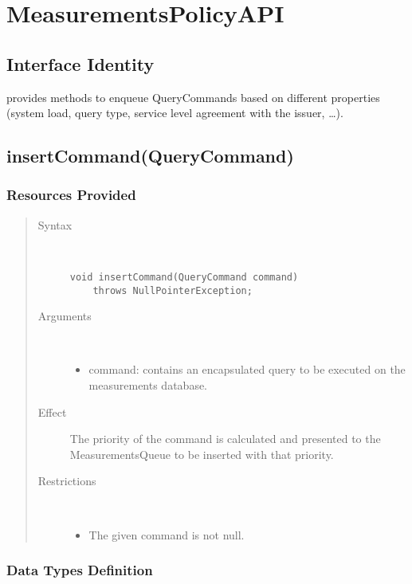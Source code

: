 \section{MeasurementsPolicyAPI}

\subsection{Interface Identity}

\npar {} provides methods to enqueue
QueryCommands based on different properties (system load, query type, service
level agreement with the issuer, \ldots).

\subsection{insertCommand(QueryCommand)}

\subsubsection{Resources Provided}

\begin{quote}
	\begin{description}
		\item[Syntax] \ 
		\begin{verbatim}
void insertCommand(QueryCommand command) 
    throws NullPointerException;
		\end{verbatim}
		\item[Arguments] \
		\begin{itemize}
			\item command: contains an encapsulated query to be executed on the
			measurements database.
		\end{itemize}
		\item[Effect] The priority of the command is calculated and presented to the
		MeasurementsQueue to be inserted with that priority.
		\item[Restrictions] \ 
		\begin{itemize}
			\item The given command is not null.
		\end{itemize}
	\end{description} 
\end{quote}

\subsubsection{Data Types Definition}

